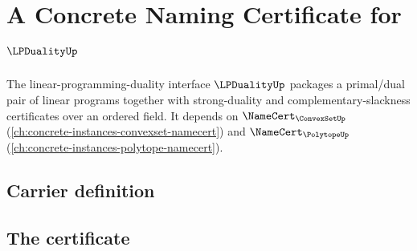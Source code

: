 \chapter{A Concrete Naming Certificate for $\LPDualityUp$}
\label{ch:concrete-instances-lpduality-namecert}

The linear-programming-duality interface $\LPDualityUp$ packages a primal/dual pair of linear programs together with strong-duality and complementary-slackness certificates over an ordered field. It depends on $\NameCert_{\ConvexSetUp}$ (\autoref{ch:concrete-instances-convexset-namecert}) and $\NameCert_{\PolytopeUp}$ (\autoref{ch:concrete-instances-polytope-namecert}).

\section{Carrier definition}
\label{sec:lpduality-carrier}

\section{The certificate}
\label{sec:lpduality-certificate}

